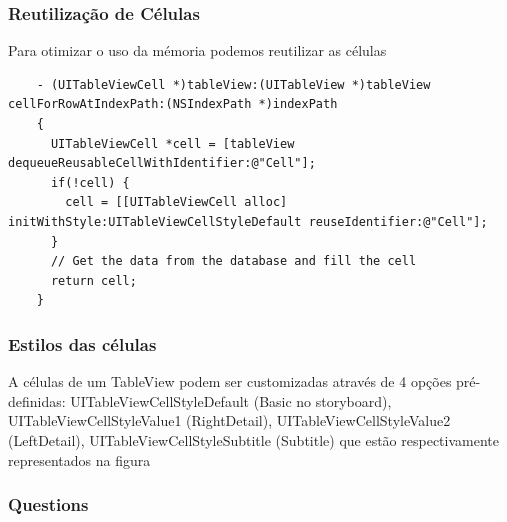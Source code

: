 \documentclass[serif,mathserif]{beamer}
\begin{document}
\begin{frame}[fragile]
  \frametitle{Reutilização de Células}
  Para otimizar o uso da mémoria podemos reutilizar as células
  \begin{lstlisting}
    - (UITableViewCell *)tableView:(UITableView *)tableView cellForRowAtIndexPath:(NSIndexPath *)indexPath
    {
      UITableViewCell *cell = [tableView dequeueReusableCellWithIdentifier:@"Cell"];
      if(!cell) {
        cell = [[UITableViewCell alloc] initWithStyle:UITableViewCellStyleDefault reuseIdentifier:@"Cell"];
      }
      // Get the data from the database and fill the cell
      return cell;
    }  
  \end{lstlisting}
\end{frame}

\begin{frame}
  \frametitle{Estilos das células}
  A células de um TableView podem ser customizadas através de 4 opções pré-definidas:
  UITableViewCellStyleDefault (Basic no storyboard), UITableViewCellStyleValue1 (RightDetail),
  UITableViewCellStyleValue2 (LeftDetail),
  UITableViewCellStyleSubtitle (Subtitle) que estão respectivamente representados na figura
  \begin{figure}[t]
    \centering
  \end{figure}
\end{frame}





\begin{frame}
  \frametitle{Questions}
\end{frame}
\end{document}
